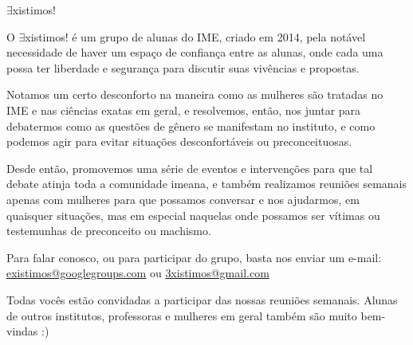 \begin{subsecao}{$\exists$xistimos!}

O $\exists$xistimos! é um grupo de alunas do IME, criado em 2014, pela notável necessidade de haver um espaço de confiança entre as alunas, onde cada uma possa ter liberdade e segurança para discutir suas vivências e propostas.

Notamos um certo desconforto na maneira como as mulheres são tratadas no IME e nas ciências exatas em geral, e resolvemos, então, nos juntar para debatermos como as questões de gênero se manifestam no instituto, e como podemos agir para evitar situações desconfortáveis ou preconceituosas.

Desde então, promovemos uma série de eventos e intervenções para que tal debate atinja toda a comunidade imeana, e também realizamos reuniões semanais apenas com mulheres para que possamos conversar e nos ajudarmos, em quaisquer situações, mas em especial naquelas onde possamos ser vítimas ou testemunhas de preconceito ou machismo.

Para falar conosco, ou para participar do grupo, basta nos enviar um e-mail: \url{existimos@googlegroups.com} ou \url{3xistimos@gmail.com}

Todas vocês estão convidadas a participar das nossas reuniões semanais. Alunas de outros institutos, professoras e mulheres em geral também são muito bem-vindas :)

\end{subsecao}
